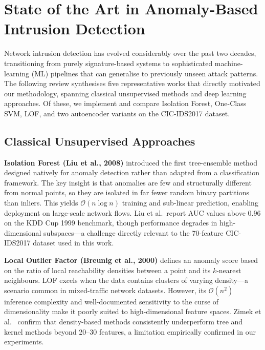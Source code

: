 \section{State of the Art in Anomaly-Based Intrusion Detection}

Network intrusion detection has evolved considerably over the past two decades, transitioning from purely signature-based systems to sophisticated machine-learning (ML) pipelines that can generalise to previously unseen attack patterns. The following review synthesises five representative works that directly motivated our methodology, spanning classical unsupervised methods and deep learning approaches. Of these, we implement and compare Isolation Forest, One-Class SVM, LOF, and two autoencoder variants on the CIC-IDS2017 dataset.

\subsection{Classical Unsupervised Approaches}

\textbf{Isolation Forest (Liu et al., 2008)} \cite{liu2008isolation} introduced the first tree-ensemble method designed natively for anomaly detection rather than adapted from a classification framework. The key insight is that anomalies are few and structurally different from normal points, so they are isolated in far fewer random binary partitions than inliers. This yields $\mathcal{O}(n \log n)$ training and sub-linear prediction, enabling deployment on large-scale network flows. Liu et al.\ report AUC values above 0.96 on the KDD Cup 1999 benchmark, though performance degrades in high-dimensional subspaces—a challenge directly relevant to the 70-feature CIC-IDS2017 dataset used in this work.

\textbf{Local Outlier Factor (Breunig et al., 2000)} \cite{breunig2000lof} defines an anomaly score based on the ratio of local reachability densities between a point and its $k$-nearest neighbours. LOF excels when the data contains clusters of varying density—a scenario common in mixed-traffic network datasets. However, its $\mathcal{O}(n^2)$ inference complexity and well-documented sensitivity to the curse of dimensionality \cite{zimek2012survey} make it poorly suited to high-dimensional feature spaces. Zimek et al.\ \cite{zimek2012survey} confirm that density-based methods consistently underperform tree and kernel methods beyond 20--30 features, a limitation empirically confirmed in our experiments.

